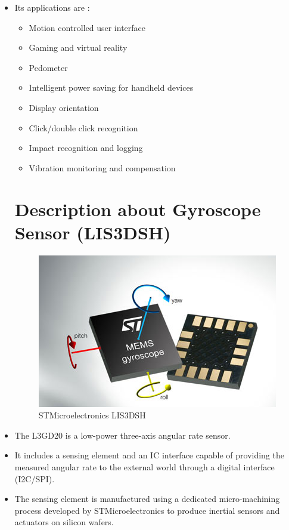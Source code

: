 \documentclass[11pt,a4paper]{article}
\begin{document}
\begin{itemize}
\item Its applications are :
\begin{itemize}
\item Motion controlled user interface
\item Gaming and virtual reality
\item Pedometer
\item Intelligent power saving for handheld devices
\item Display orientation
\item Click/double click recognition
\item Impact recognition and logging
\item Vibration monitoring and compensation

\end{itemize}

\newpage
\section{Description about Gyroscope Sensor (LIS3DSH)}

\begin{figure}[h]
    \centering
	\includegraphics[scale=0.5]{gyroscope.png}
	\caption {STMicroelectronics LIS3DSH}
	\end{figure}

\item The L3GD20 is a low-power three-axis angular
rate sensor.

\item It includes a sensing element and an IC interface
capable of providing the measured angular rate to
the external world through a digital interface
(I2C/SPI).

\item The sensing element is manufactured using a
dedicated  micro-machining process developed by
STMicroelectronics to produce inertial sensors
and actuators on silicon wafers.


\end{itemize}
\end{document}

